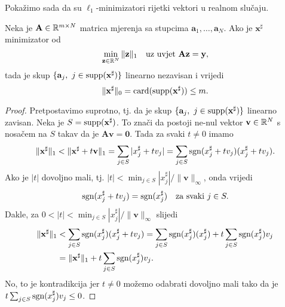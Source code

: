 \documentclass[a4paper,twoside,12pt]{memoir} %
\newcommand{\vect}[1]{\mathbf{#1}}
\renewcommand{\vec}{\vect}
\newcommand{\card}{\text{\normalfont{card}}}
\newcommand{\supp}{\text{\normalfont{supp}}}
\newcommand{\norm}[1]{\|{#1}\|}
\newcommand{\sgn}{\text{\normalfont{sgn}}}
\begin{document}
\noindent Poka\v{z}imo sada da su $\ell_1$-minimizatori rijetki vektori u realnom slu\v{c}aju.
\begin{thm}
    Neka je $\vec A \in \R^{m \times N}$ matrica mjerenja sa stupcima $\vec a_1, \dots, \vec a_N$. Ako je $\vec x^{\sharp}$ minimizator od
    \begin{equation*}
        \min_{\vec z \in \R^N} \norm{\vec z}_1\quad \text{uz uvjet } \vec{Az}=\vec y,
    \end{equation*}
    tada je skup $\{\vec a_j,\ j \in \supp(\vec x^{\sharp})\}$ linearno nezavisan i vrijedi
    \begin{equation*}
        \norm{\vec{x}^{\sharp}}_0 = \card(\supp(\vec x^{\sharp})) \leq m. 
    \end{equation*}
\end{thm}
\begin{proof}
    Pretpostavimo suprotno, tj. da je skup $\{\vec a_j,\ j \in \supp(\vec x^{\sharp})\}$ linearno zavisan. Neka je $S= \supp(\vec x^{\sharp})$. To zna\v{c}i da postoji ne-nul vektor $\vec v \in \R^N$ s nosa\v{c}em na $S$ takav da je $\vec{Av} = \vec 0$. Tada za svaki $t \not= 0$ imamo
    \begin{equation*}
        \norm{\vec x^{\sharp}}_1 < \norm{\vec x^{\sharp} + t \vec v}_1 = \sum_{j \in S}|x_j^{\sharp} + tv_j| = \sum_{j \in S}\sgn(x_j^{\sharp}+tv_j)(x_j^{\sharp}+tv_j).
    \end{equation*}
    Ako je $|t|$ dovoljno mali, tj. $|t| < \min_{j \in S}|x_j^{\sharp}|/ \norm{\vec v}_{\infty}$, onda vrijedi
    \begin{equation*}
        \sgn(x_j^{\sharp}+tv_j) = \sgn(x_j^{\sharp})\quad \text{za svaki }j \in S.
    \end{equation*}
    Dakle, za $0<|t|<\min_{j \in S}|x_j^{\sharp}|/ \norm{\vec v}_{\infty}$ slijedi
    \begin{equation*}
    \begin{split}
        \norm{\vec x^{\sharp}}_1 & <  \sum_{j \in S} \sgn(x_j^{\sharp})(x_j^{\sharp}+tv_j)=\sum_{j \in S} \sgn(x_j^{\sharp})(x_j^{\sharp})+t \sum_{j \in S}\sgn(x_j^{\sharp})v_j \\ &= \norm{\vec x^{\sharp}}_1 + t \sum_{j \in S}\sgn(x_j^{\sharp})v_j.
    \end{split}
    \end{equation*}
    No, to je kontradikcija jer $t \not = 0$ mo\v{z}emo odabrati dovoljno mali tako da je \\ $t \sum_{j \in S}\sgn(x_j^{\sharp})v_j \leq 0$.
\end{proof}
\end{document}
